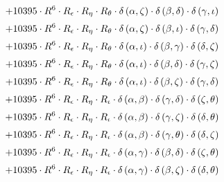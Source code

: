 \begin{subequations}
\begin{gather}
 \\[0.2em] \notag 		 + 10395 \cdot R^{6} \cdot R_{\epsilon{}} \cdot R_{\eta{}} \cdot R_{\theta{}} \cdot \delta{}\left(\alpha{}, \zeta{}\right) \cdot \delta{}\left(\beta{}, \delta{}\right) \cdot \delta{}\left(\gamma{}, \iota{}\right) 
 \\[0.2em] \notag 		 + 10395 \cdot R^{6} \cdot R_{\epsilon{}} \cdot R_{\eta{}} \cdot R_{\theta{}} \cdot \delta{}\left(\alpha{}, \zeta{}\right) \cdot \delta{}\left(\beta{}, \iota{}\right) \cdot \delta{}\left(\gamma{}, \delta{}\right) 
 \\[0.2em] \notag 		 + 10395 \cdot R^{6} \cdot R_{\epsilon{}} \cdot R_{\eta{}} \cdot R_{\theta{}} \cdot \delta{}\left(\alpha{}, \iota{}\right) \cdot \delta{}\left(\beta{}, \gamma{}\right) \cdot \delta{}\left(\delta{}, \zeta{}\right) 
 \\[0.2em] \notag 		 + 10395 \cdot R^{6} \cdot R_{\epsilon{}} \cdot R_{\eta{}} \cdot R_{\theta{}} \cdot \delta{}\left(\alpha{}, \iota{}\right) \cdot \delta{}\left(\beta{}, \delta{}\right) \cdot \delta{}\left(\gamma{}, \zeta{}\right) 
 \\[0.2em] \notag 		 + 10395 \cdot R^{6} \cdot R_{\epsilon{}} \cdot R_{\eta{}} \cdot R_{\theta{}} \cdot \delta{}\left(\alpha{}, \iota{}\right) \cdot \delta{}\left(\beta{}, \zeta{}\right) \cdot \delta{}\left(\gamma{}, \delta{}\right) 
 \\[0.2em] \notag 		 + 10395 \cdot R^{6} \cdot R_{\epsilon{}} \cdot R_{\eta{}} \cdot R_{\iota{}} \cdot \delta{}\left(\alpha{}, \beta{}\right) \cdot \delta{}\left(\gamma{}, \delta{}\right) \cdot \delta{}\left(\zeta{}, \theta{}\right) 
 \\[0.2em] \notag 		 + 10395 \cdot R^{6} \cdot R_{\epsilon{}} \cdot R_{\eta{}} \cdot R_{\iota{}} \cdot \delta{}\left(\alpha{}, \beta{}\right) \cdot \delta{}\left(\gamma{}, \zeta{}\right) \cdot \delta{}\left(\delta{}, \theta{}\right) 
 \\[0.2em] \notag 		 + 10395 \cdot R^{6} \cdot R_{\epsilon{}} \cdot R_{\eta{}} \cdot R_{\iota{}} \cdot \delta{}\left(\alpha{}, \beta{}\right) \cdot \delta{}\left(\gamma{}, \theta{}\right) \cdot \delta{}\left(\delta{}, \zeta{}\right) 
 \\[0.2em] \notag 		 + 10395 \cdot R^{6} \cdot R_{\epsilon{}} \cdot R_{\eta{}} \cdot R_{\iota{}} \cdot \delta{}\left(\alpha{}, \gamma{}\right) \cdot \delta{}\left(\beta{}, \delta{}\right) \cdot \delta{}\left(\zeta{}, \theta{}\right) 
 \\[0.2em] \notag 		 + 10395 \cdot R^{6} \cdot R_{\epsilon{}} \cdot R_{\eta{}} \cdot R_{\iota{}} \cdot \delta{}\left(\alpha{}, \gamma{}\right) \cdot \delta{}\left(\beta{}, \zeta{}\right) \cdot \delta{}\left(\delta{}, \theta{}\right) 

\end{gather}
\end{subequations}
